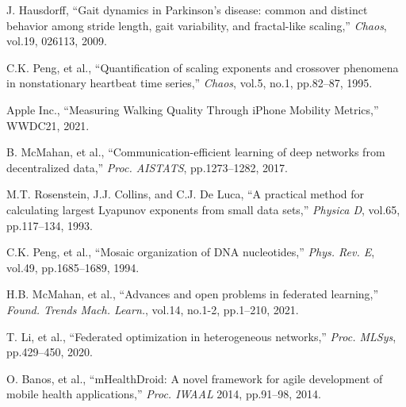\documentclass[paper]{ieice}
\begin{document}
\begin{thebibliography}{99}
J. Hausdorff, ``Gait dynamics in Parkinson's disease: common and distinct behavior among stride length, gait variability, and fractal-like scaling,'' \textit{Chaos}, vol.19, 026113, 2009.

C.K. Peng, et al., ``Quantification of scaling exponents and crossover phenomena in nonstationary heartbeat time series,'' \textit{Chaos}, vol.5, no.1, pp.82--87, 1995.

Apple Inc., ``Measuring Walking Quality Through iPhone Mobility Metrics,'' WWDC21, 2021.

B. McMahan, et al., ``Communication-efficient learning of deep networks from decentralized data,'' \textit{Proc. AISTATS}, pp.1273--1282, 2017.

M.T. Rosenstein, J.J. Collins, and C.J. De Luca, ``A practical method for calculating largest Lyapunov exponents from small data sets,'' \textit{Physica D}, vol.65, pp.117--134, 1993.

C.K. Peng, et al., ``Mosaic organization of DNA nucleotides,'' \textit{Phys. Rev. E}, vol.49, pp.1685--1689, 1994.

H.B. McMahan, et al., ``Advances and open problems in federated learning,'' \textit{Found. Trends Mach. Learn.}, vol.14, no.1-2, pp.1--210, 2021.

T. Li, et al., ``Federated optimization in heterogeneous networks,'' \textit{Proc. MLSys}, pp.429--450, 2020.

O. Banos, et al., ``mHealthDroid: A novel framework for agile development of mobile health applications,'' \textit{Proc. IWAAL} 2014, pp.91--98, 2014.
\end{thebibliography}
\end{document}
